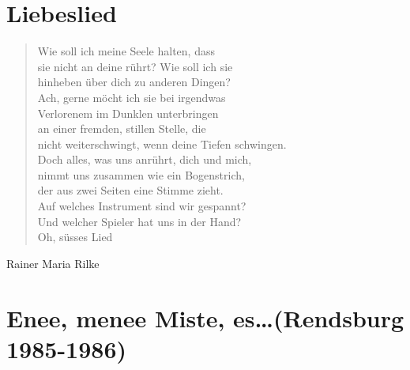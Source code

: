 \documentclass[10pt,a5paper]{book}
\newenvironment{dichter}{\begin{flushright}}{\end{flushright}}
\begin{document}
\section*{Liebeslied}



\begin{verse}
Wie soll ich meine Seele halten, dass\\
sie nicht an deine rührt? Wie soll ich sie\\
hinheben über dich zu anderen Dingen?\\
Ach, gerne möcht ich sie bei irgendwas\\
Verlorenem im Dunklen unterbringen\\
an einer fremden, stillen Stelle, die\\
nicht weiterschwingt, wenn deine Tiefen schwingen.\\
Doch alles, was uns anrührt, dich und mich,\\
nimmt uns zusammen wie ein Bogenstrich,\\
der aus zwei Seiten eine Stimme zieht.\\
Auf welches Instrument sind wir gespannt?\\
Und welcher Spieler hat uns in der Hand?\\
Oh, süsses Lied
\end{verse}
\begin{dichter}Rainer Maria Rilke\end{dichter}


\section*{Enee, menee Miste, es\dots (Rendsburg 1985-1986)}
\end{document}
